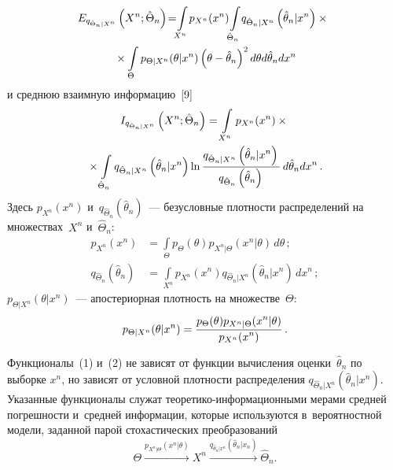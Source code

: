 \begin{multicols}{2}
\noindent
\begin{multline}
\!\!E_{q_{\hat{\Theta}_n\vert X^n}}\left(X^n;\hat{\Theta}_n\right)\! =\!\!
\int\limits_{X^n} \!p_{X^n}(x^n) \!
\int\limits_{\hat{\Theta}_n} \! q_{\hat{\Theta}_n \vert X^n} \left(\hat{\theta}_n\vert x^n\right)\times{}\hspace*{-0.3pt}\\
{}\times \int\limits_{\Theta} 
p_{\Theta\vert X^n}(\theta\vert x^n)\left(\theta - \hat{\theta}_n\right)^2 d\theta d\hat{\theta}_n dx^n
\label{e1-lan}
\end{multline}
и среднюю взаимную информацию~[9]
\begin{multline}
I_{q_{\hat{\Theta}_n\vert X^n}} \left( X^n; \hat{\Theta}_n\right) =
\int\limits_{X^n} p_{X^n}(x^n) \times{}\\
{}\times
\int\limits_{\hat{\Theta}_n} q_{\hat{\Theta}_n\vert X^n} \left( \hat{\theta}_n\vert x^n\right) 
\ln\displaystyle\frac{\displaystyle q_{\hat{\Theta}_n\vert X^n} \left(\hat{\theta}_n\vert x^n\right)\mathstrut}{\displaystyle q_{\hat{\Theta}_n} 
\left(\hat{\theta}_n\right)\mathstrut}\,d\hat{\theta}_n dx^n\,.
\label{e2-lan}
\end{multline}
Здесь $p_{X^n}(x^n)$ и~$q_{\hat{\Theta}_n} ( \hat{\theta}_n)$~--- 
безусловные плотности распределений на множествах~$X^n$ и~$\hat{\Theta}_n$:
\begin{align*}
p_{X^n}(x^n) &= \int\limits_{\Theta} p_\Theta(\theta) p_{X^n\vert \Theta} \left( 
x^n\vert\theta\right)\,d\theta\,;\\
q_{\hat{\Theta}_n} \left( \hat{\theta}_n\right) &= \int\limits_{X^n} p_{X^n}\left( x^n\right) 
q_{\hat{\Theta}_n\vert X^n} \left( \hat{\theta}_n\vert x^n\right)\,dx^n\,;
\end{align*}
 $p_{\Theta\vert X^n}(\theta\vert x^n)$~--- апостериорная плот\-ность на множестве~$\Theta$:
$$
p_{\Theta\vert X^n}(\theta\vert x^n) =\displaystyle\frac{\displaystyle p_\Theta(\theta) p_{X^n\vert \Theta}(x^n\vert 
\theta)\mathstrut}{\displaystyle p_{X^n}(x^n)\mathstrut} \,.
$$


Функционалы~(1) и~(2) не зависят от функции вычисления оценки~$\hat{\theta}_n$ по выборке 
$x^n$, но зависят от условной плот\-ности распределения $q_{\hat{\Theta}_n\vert X^n} 
(\hat{\theta}_n\vert x^n)$. Указанные функционалы служат  
тео\-ре\-ти\-ко-ин\-фор\-ма\-ци\-он\-ны\-ми мерами средней погрешности и~средней 
информации, которые используются в~вероятностной модели, заданной парой стохастических 
преобразований 
\begin{equation*}
\Theta \xrightarrow{p_{X^n\vert\Theta}(x^n\vert \theta)}
 X^n 
 \xrightarrow{q_{\hat{\theta}_n\vert x^n} (\hat{\theta}_n\vert x_n)} \hat{\Theta}_n.
\end{equation*}


\end{multicols}
